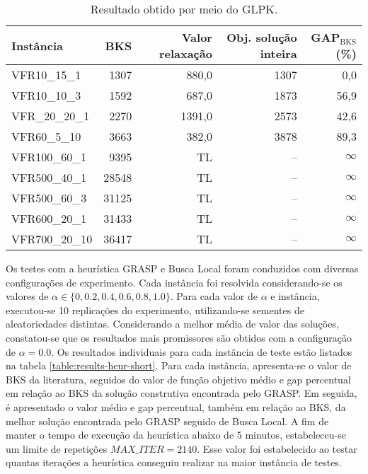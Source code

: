 \documentclass[12pt]{article}
\begin{document}
\begin{table}[ht]
   \centering
   \begin{tabular}{lrrrr}
      \toprule
      Instância & BKS & Valor relaxação & Obj. solução inteira & GAP$_\mathrm{BKS}$ (\%) \\
      \midrule
      VFR10\_15\_1 & 1307 & 880,0 & 1307 & \phantom{0}0,0\\
      VFR10\_10\_3 & 1592 & 687,0 & 1873 & 56,9\\
      VFR\_20\_20\_1 & 2270 & 1391,0 & 2573 & 42,6\\
      VFR60\_5\_10 & 3663 & 382,0 & 3878 & 89,3\\
      VFR100\_60\_1 & 9395  &  TL & -- & $\infty$\\
      VFR500\_40\_1 & 28548 &  TL & -- & $\infty$\\
      VFR500\_60\_3 & 31125 &  TL & -- & $\infty$\\
      VFR600\_20\_1 & 31433 &  TL & -- & $\infty$\\
      VFR700\_20\_10 & 36417 & TL & -- & $\infty$\\ 
      \bottomrule
   \end{tabular}
   \caption{Resultado obtido por meio do GLPK.}
   \label{table:results-glpk}
\end{table}

Os testes com a heurística GRASP e Busca Local foram conduzidos com diversas
configurações de experimento. Cada instância foi resolvida considerando-se os
valores de $\alpha \in \{0, 0.2, 0.4, 0.6, 0.8, 1.0\}$. Para cada valor de
$\alpha$ e instância, executou-se 10 replicações do experimento, 
utilizando-se sementes de aleatoriedades distintas. Considerando a melhor média
de valor das soluções, constatou-se que os resultados mais promissores são
obtidos com a configuração de $\alpha = 0.0$. Os resultados individuais para
cada instância de teste estão listados na tabela
\ref{table:results-heur-short}. Para cada instância, apresenta-se o valor de
BKS da literatura, seguidos do valor de função objetivo médio e gap percentual
em relação ao BKS da solução construtiva encontrada pelo GRASP. Em seguida, é
apresentado o valor médio e gap percentual, também em relação ao BKS, da melhor
solução encontrada pelo GRASP seguido de Busca Local. A fim de manter o tempo
de execução da heurística abaixo de 5 minutos, estabeleceu-se um limite de
repetições $\mathit{MAX\_ITER} = 2140$. Esse valor foi estabelecido ao testar
quantas iterações a heurística conseguiu realizar na maior instância de testes.
\end{document}
